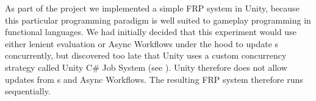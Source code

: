 As part of the project we implemented a simple \gls{FRP} system in Unity, because this particular programming paradigm is well suited to gameplay programming in functional languages\cite{maraffi:frp,cheong2005functional,courtney2003yampa}. We had initially decided that this experiment would use either lenient evaluation or Async Workflows under the hood to update s concurrently, but discovered too late that Unity uses a custom concurrency strategy called Unity C\# Job System\cite{unity:csharp:job:system} (see ). Unity therefore does not allow  updates from s and Async Workflows\cite{unity:async}. The resulting \gls{FRP} system therefore runs sequentially.
